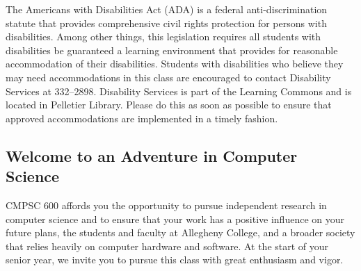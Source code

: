 \documentclass[11pt]{article}
\begin{document}
The Americans with Disabilities Act (ADA) is a federal anti-discrimination
statute that provides comprehensive civil rights protection for persons with
disabilities.  Among other things, this legislation requires all students with
disabilities be guaranteed a learning environment that provides for reasonable
accommodation of their disabilities. Students with disabilities who believe they
may need accommodations in this class are encouraged to contact Disability
Services at 332--2898.  Disability Services is part of the Learning Commons and
is located in Pelletier Library. Please do this as soon as possible to ensure
that approved accommodations are implemented in a timely fashion.

\subsection*{Welcome to an Adventure in Computer Science}

CMPSC 600 affords you the opportunity to pursue independent research in computer
science and to ensure that your work has a positive influence on your future
plans, the students and faculty at Allegheny College, and a broader society that
relies heavily on computer hardware and software.  At the start of your senior
year, we invite you to pursue this class with great enthusiasm and vigor.
\end{document}
